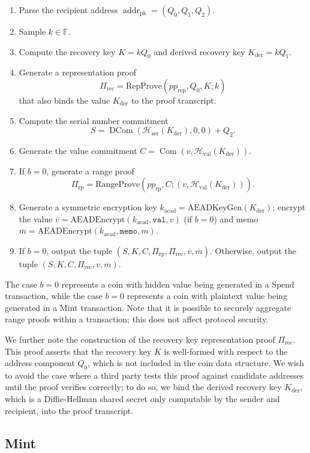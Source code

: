 \documentclass{llncs}
\newcommand{\F}{\mathbb{F}}
\newcommand{\hash}{\mathcal{H}}
\newcommand{\addr}{\operatorname{addr}}
\newcommand{\com}{\operatorname{Com}}
\newcommand{\dcom}{\operatorname{DCom}}
\begin{document}
\begin{enumerate}
\item Parse the recipient address $\addr_{\text{pk}} = (Q_0, Q_1, Q_2)$.
\item Sample $k \in \F$.
\item Compute the recovery key $K = kQ_0$ and derived recovery key $K_{\text{der}} = kQ_1$.
\item Generate a representation proof $$\Pi_{\text{rec}} = \text{RepProve}(pp_{\text{rep}},Q_0,K ; k)$$ that also binds the value $K_{\text{der}}$ to the proof transcript.
\item Compute the serial number commitment $$S = \dcom(\hash_{\text{ser}}(K_{\text{der}}), 0, 0) + Q_2.$$
\item Generate the value commitment $C = \com(v, \hash_{\text{val}}(K_{\text{der}}))$.
\item If $b=0$, generate a range proof $$\Pi_{\text{rp}} = \text{RangeProve}(pp_{\text{rp}},C;(v,\hash_{\text{val}}(K_{\text{der}}))).$$
\item Generate a symmetric encryption key $k_{\text{aead}} = \text{AEADKeyGen}(K_{\text{der}})$; encrypt the value $\overline{v} = \text{AEADEncrypt}(k_{\text{aead}},\texttt{val},v)$ (if $b=0$) and memo $\overline{m} = \text{AEADEncrypt}(k_{\text{aead}},\texttt{memo},m)$.
\item If $b=0$, output the tuple $(S, K, C, \Pi_{\text{rp}}, \Pi_{\text{rec}}, \overline{v}, \overline{m})$.
Otherwise, output the tuple $(S, K, C, \Pi_{\text{rec}}, v, \overline{m})$.
\end{enumerate}
The case $b=0$ represents a coin with hidden value being generated in a $\text{Spend}$ transaction, while the case $b=0$ represents a coin with plaintext value being generated in a $\text{Mint}$ transaction.
Note that it is possible to securely aggregate range proofs within a transaction; this does not affect protocol security.

We further note the construction of the recovery key representation proof $\Pi_{\text{rec}}$.
This proof asserts that the recovery key $K$ is well-formed with respect to the address component $Q_0$, which is not included in the coin data structure.
We wish to avoid the case where a third party tests this proof against candidate addresses until the proof verifies correctly; to do so, we bind the derived recovery key $K_{\text{der}}$, which is a Diffie-Hellman shared secret only computable by the sender and recipient, into the proof transcript.


\subsection{Mint}
\end{document}
